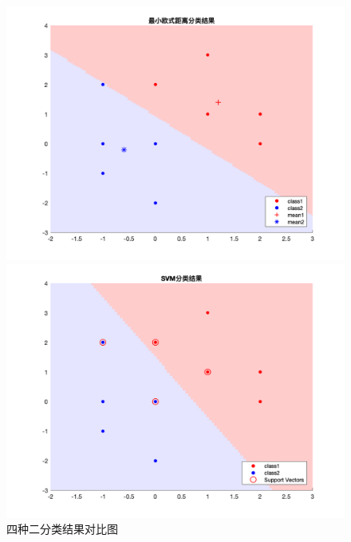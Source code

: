 \documentclass[cn]{elegantbook}
\begin{document}
\begin{figure}[!h]
\begin{minipage}[h]{0.48\linewidth}
	\end{minipage}
	\begin{minipage}[h]{0.48\linewidth}
		\centering
		\includegraphics[width=\textwidth]{images/res}
	\end{minipage}
	\begin{minipage}[h]{0.48\linewidth}
		\centering
		\includegraphics[width=\textwidth]{images/svmres}
	\end{minipage}
	\caption{\label{compare}四种二分类结果对比图}
\end{figure}
\end{document}
